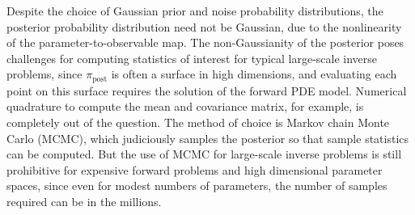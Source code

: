 \documentclass[11pt,final]{article}%
\renewcommand{\matrix}[1] {\ensuremath{\boldsymbol{#1}}}
\renewcommand{\vec}[1] {\ensuremath{\boldsymbol{#1}}}
\begin{document}
Despite the choice of Gaussian prior and noise probability distributions, the posterior probability distribution need not be Gaussian, due to the nonlinearity of the parameter-to-observable map.
The non-Gaussianity of the posterior poses challenges for computing statistics of interest for typical large-scale inverse problems, since $\pi_{\text{post}}$ is often a surface in high dimensions, and evaluating each point on this surface requires the solution of the forward PDE model.
Numerical quadrature to compute the mean and covariance
matrix, for example, is completely out of the question. The method of choice is Markov chain Monte Carlo (MCMC), which judiciously samples the posterior
so that sample statistics can be computed. But the use of MCMC for large-scale inverse problems is still prohibitive for expensive forward problems and high dimensional parameter spaces, since even for modest numbers of parameters, the number of samples required can be in the millions.
\end{document}
